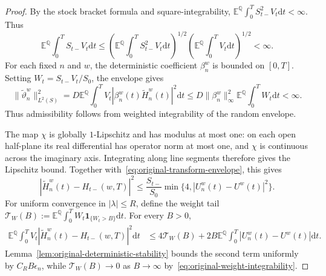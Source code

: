 \documentclass[11pt]{article}
\theoremstyle{definition}
\theoremstyle{remark}
\newcommand{\E}{\mathbb{E}}
\newcommand{\Q}{\mathbb{Q}}
\newcommand{\1}{\mathbf{1}}
\newcommand{\dd}{\mathrm{d}}
\begin{document}
\begin{proof}
By the stock bracket formula and square-integrability,
$\E^\Q\int_0^T S_{t-}^2V_t\dd t<\infty$. Thus
\begin{equation}
\label{eq:original-weight-integrability}
 \E^\Q\int_0^T S_{t-}V_t\dd t
 \leq\left(\E^\Q\int_0^T S_{t-}^2V_t\dd t\right)^{1/2}
      \left(\E^\Q\int_0^T V_t\dd t\right)^{1/2}<\infty.
\end{equation}
For each fixed $n$ and $w$, the deterministic coefficient $\beta_n^w$ is
bounded on $[0,T]$. Setting $W_t=S_{t-}V_t/S_0$, the envelope gives
\[
 \|\widetilde\vartheta_n^w\|_{L^2(S)}^2
 =D\E^\Q\int_0^T V_t|\beta_n^w(t)\widetilde H_n^w(t)|^2\dd t
 \leq D\|\beta_n^w\|_\infty^2\E^\Q\int_0^T W_t\dd t<\infty.
\]
Thus admissibility follows from weighted integrability of the random
envelope.

The map $\chi$ is globally $1$-Lipschitz and has modulus at most one:
on each open half-plane its real differential has operator norm at most
one, and $\chi$ is continuous across the imaginary axis. Integrating along
line segments therefore gives the Lipschitz bound.
Together with~\eqref{eq:original-transform-envelope}, this gives
\[
 |\widetilde H_n^w(t)-H_{t-}(w,T)|^2
 \leq\frac{S_{t-}}{S_0}
        \min\{4,|U_n^w(t)-U^w(t)|^2\}.
\]
For uniform convergence in $|\lambda|\leq R$, define the weight tail
$\mathcal T_W(B):=\E^\Q\int_0^T W_t\mathbf1_{\{W_t>B\}}\dd t$.
For every $B>0$,
\begin{align*}
 \E^\Q\int_0^T V_t|\widetilde H_n^w(t)-H_{t-}(w,T)|^2\dd t
 &\leq 4\mathcal T_W(B)
       +2B\E^\Q\int_0^T|U_n^w(t)-U^w(t)|\dd t.
\end{align*}
Lemma~\ref{lem:original-deterministic-stability} bounds the second term
uniformly by $C_R B\epsilon_n$, while
$\mathcal T_W(B)\to0$ as $B\to\infty$ by~\eqref{eq:original-weight-integrability}.


\end{proof}
\end{document}
